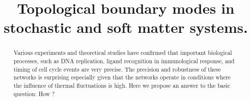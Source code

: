 \documentclass[amsmath,preprintnumbers,10pt,twocolumn,prl]{revtex4-1}
\begin{document}
\title{Topological boundary modes in stochastic and soft matter systems.}
\author{} 

\begin{abstract}

Various experiments and theoretical studies have confirmed that important biological processes, such as DNA replication, ligand recognition in immunological response, and timing of cell cycle events are very precise. The precision and robustness of these networks is surprising especially given that the networks operate in conditions where the influence of thermal fluctuations is high. Here we propose an answer to the basic question: How ? 

\end{abstract}
\maketitle 


\end{document}
